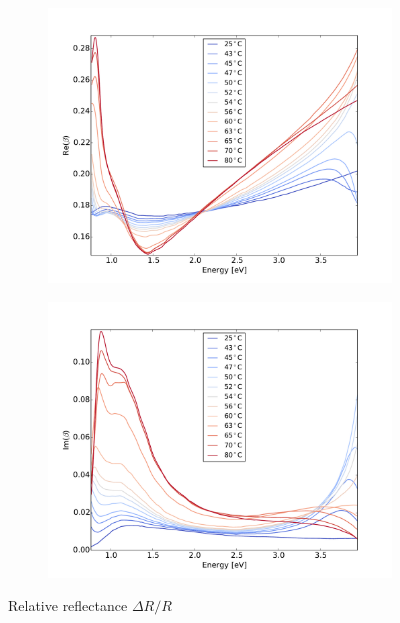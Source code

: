 \begin{figure}
    \begin{subfigure}[b]{0.49\textwidth}
        \centering
        \includegraphics[width=\textwidth]{Results/Sim2/re_beta.pdf}
        \caption{}
        \label{fig:2}
    \end{subfigure}
    \begin{subfigure}[b]{0.49\textwidth}
        \centering
        \includegraphics[width=\textwidth]{Results/Sim2/im_beta.pdf}
        \caption{}
        \label{fig:2}
    \end{subfigure}
    \caption{Relative reflectance $\Delta R/R$}
    \label{fig:}
\end{figure}
%



